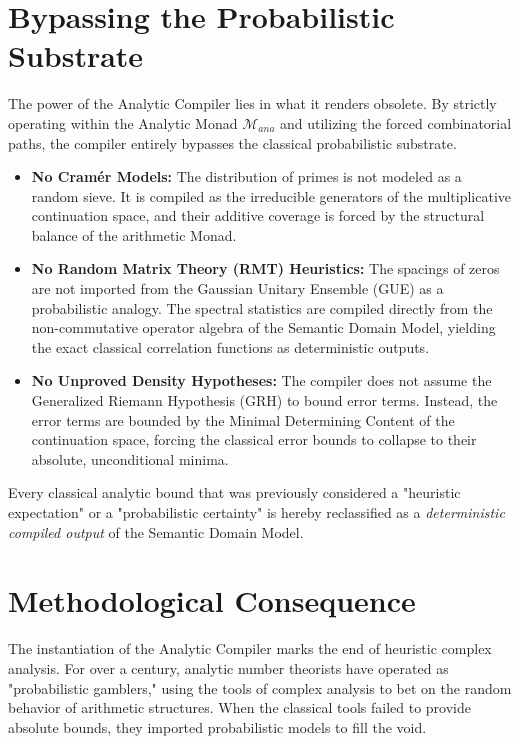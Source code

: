 \documentclass[12pt,openany]{extbook}
\theoremstyle{plain}
\theoremstyle{definition}
\begin{document}
\section{Bypassing the Probabilistic Substrate}

The power of the Analytic Compiler lies in what it renders obsolete. By strictly operating within the Analytic Monad $\mathcal{M}_{ana}$ and utilizing the forced combinatorial paths, the compiler entirely bypasses the classical probabilistic substrate.

\begin{itemize}
    \item \textbf{No Cramér Models:} The distribution of primes is not modeled as a random sieve. It is compiled as the irreducible generators of the multiplicative continuation space, and their additive coverage is forced by the structural balance of the arithmetic Monad.
    \item \textbf{No Random Matrix Theory (RMT) Heuristics:} The spacings of zeros are not imported from the Gaussian Unitary Ensemble (GUE) as a probabilistic analogy. The spectral statistics are compiled directly from the non-commutative operator algebra of the Semantic Domain Model, yielding the exact classical correlation functions as deterministic outputs.
    \item \textbf{No Unproved Density Hypotheses:} The compiler does not assume the Generalized Riemann Hypothesis (GRH) to bound error terms. Instead, the error terms are bounded by the Minimal Determining Content of the continuation space, forcing the classical error bounds to collapse to their absolute, unconditional minima.
\end{itemize}

Every classical analytic bound that was previously considered a "heuristic expectation" or a "probabilistic certainty" is hereby reclassified as a \emph{deterministic compiled output} of the Semantic Domain Model.

\section{Methodological Consequence}

The instantiation of the Analytic Compiler marks the end of heuristic complex analysis. For over a century, analytic number theorists have operated as "probabilistic gamblers," using the tools of complex analysis to bet on the random behavior of arithmetic structures. When the classical tools failed to provide absolute bounds, they imported probabilistic models to fill the void.
\end{document}
